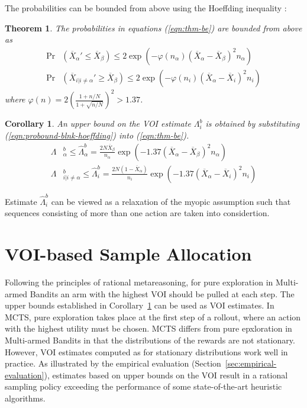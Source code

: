\documentclass{ecai2012}
\newtheorem{thm}{Theorem}
\newtheorem{crl}{Corollary}
\begin{document}
The probabilities can be bounded from above using the
Hoeffding inequality \cite{Hoeffding.ineq}:
\begin{thm} The probabilities in equations (\ref{eqn:thm-be}) are bounded from above as
\begin{align}
\Pr&(\overline X_\alpha' \le \overline X_\beta)
  \le 2\exp\left(- \varphi(n_\alpha)(\overline X_\alpha - \overline X_\beta)^2 n_\alpha
   \right)\nonumber\\
\Pr&(\overline X_{i|i\ne\alpha}' \ge \overline X_\beta)
   \le 2\exp\left(- \varphi(n_i) (\overline X_\alpha -\overline  X_i)^2 n_i \right)
\label{eqn:probound-blnk-hoeffding}
\end{align}
where $\varphi(n)=2(\frac {1+n/N} {1+\sqrt {n/N}})^2 > 1.37$.
\label{thm:hoeffding-prob-bounds}
\end{thm}
\vspace{-16pt}
\begin{crl}
An upper bound on the VOI estimate $\Lambda_i^b$ is obtained
by substituting (\ref{eqn:probound-blnk-hoeffding}) into (\ref{eqn:thm-be}).
\begin{align}
  \Lambda&_\alpha^b \le \hat\Lambda_\alpha^b=\frac {2N\overline X_\beta} {n_\alpha}\exp\left(- 1.37(\overline X_\alpha - \overline X_\beta)^2 n_\alpha\right)\nonumber\\
  \Lambda&_{i|i\ne\alpha}^b\le \hat\Lambda_i^b=  \frac {2N(1-\overline  X_\alpha)} {n_i}\exp\left(- 1.37(\overline X_\alpha - \overline X_i)^2 n_i\right)
\label{eqn:bound-blnk-hoeffding}
\end{align}
\label{crl:bound-blnk-hoeffding}
\end{crl}
\vspace{-16pt}
Estimate $\hat\Lambda_i^b$ can be viewed as a
relaxation of the myopic assumption such that sequences consisting
of more than one action are taken into considertion.

\section{VOI-based Sample Allocation}

Following the principles of rational metareasoning, for pure
exploration in Multi-armed Bandits an arm with
the highest VOI should be pulled at each step. The upper bounds
established in Corollary~\ref{crl:bound-blnk-hoeffding} can be used
as VOI estimates. In MCTS, pure exploration takes place at the first
step of a rollout, where an action with the highest utility must
be chosen. MCTS differs from pure epxloration in Multi-armed Bandits
in that the distributions of the rewards are not stationary. However,
VOI estimates computed as for stationary distributions work well in
practice. As illustrated by the empirical evaluation
(Section~\ref{sec:empirical-evaluation}), estimates based on upper
bounds on the VOI result in a rational sampling policy exceeding the
performance of some state-of-the-art heuristic algorithms.
\end{document}
